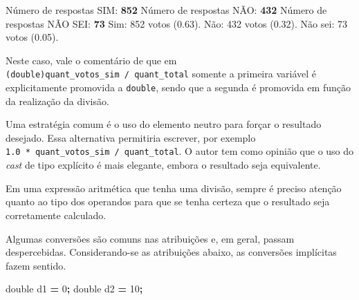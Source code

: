 \documentclass[
  11pt,
  a4paper,
]{scrbook}
\newenvironment{Shaded}{\begin{snugshade}}{\end{snugshade}}
\newcommand{\DataTypeTok}[1]{\textcolor[rgb]{0.13,0.29,0.53}{#1}}
\newcommand{\DecValTok}[1]{\textcolor[rgb]{0.00,0.00,0.81}{#1}}
\newcommand{\KeywordTok}[1]{\textcolor[rgb]{0.13,0.29,0.53}{\textbf{#1}}}
\newcommand{\NormalTok}[1]{#1}
\newcommand{\OperatorTok}[1]{\textcolor[rgb]{0.81,0.36,0.00}{\textbf{#1}}}
\begin{document}
\begin{Shaded}
\begin{Highlighting}[]
\NormalTok{Número de respostas SIM: }\KeywordTok{ 852 }
\NormalTok{Número de respostas NÃO: }\KeywordTok{ 432 }
\NormalTok{Número de respostas NÃO SEI: }\KeywordTok{ 73 }
\NormalTok{Sim: 852 votos (0.63).}
\NormalTok{Não: 432 votos (0.32).}
\NormalTok{Não sei: 73 votos (0.05).}
\end{Highlighting}
\end{Shaded}

Neste caso, vale o comentário de que em
\texttt{(double)quant\_votos\_sim\ /\ quant\_total} somente a primeira
variável é explicitamente promovida a \texttt{double}, sendo que a
segunda é promovida em função da realização da divisão.

Uma estratégia comum é o uso do elemento neutro para forçar o resultado
desejado. Essa alternativa permitiria escrever, por exemplo
\texttt{1.0\ *\ quant\_votos\_sim\ /\ quant\_total}. O autor tem como
opinião que o uso do \emph{cast} de tipo explícito é mais elegante,
embora o resultado seja equivalente.

\begin{tcolorbox}[enhanced jigsaw, arc=.35mm, bottomtitle=1mm, colbacktitle=quarto-callout-tip-color!10!white, title=\textcolor{quarto-callout-tip-color}{\faLightbulb}\hspace{0.5em}{Dica}, toprule=.15mm, left=2mm, opacityback=0, colback=white, colframe=quarto-callout-tip-color-frame, opacitybacktitle=0.6, bottomrule=.15mm, leftrule=.75mm, toptitle=1mm, coltitle=black, titlerule=0mm, rightrule=.15mm, breakable]

Em uma expressão aritmética que tenha uma divisão, sempre é preciso
atenção quanto ao tipo dos operandos para que se tenha certeza que o
resultado seja corretamente calculado.

\end{tcolorbox}

Algumas conversões são comuns nas atribuições e, em geral, passam
despercebidas. Considerando-se as atribuições abaixo, as conversões
implícitas fazem sentido.

\begin{Shaded}
\begin{Highlighting}[]
\DataTypeTok{double}\NormalTok{ d1 }\OperatorTok{=} \DecValTok{0}\OperatorTok{;}
\DataTypeTok{double}\NormalTok{ d2 }\OperatorTok{=} \DecValTok{10}\OperatorTok{;}
\end{Highlighting}
\end{Shaded}
\end{document}
